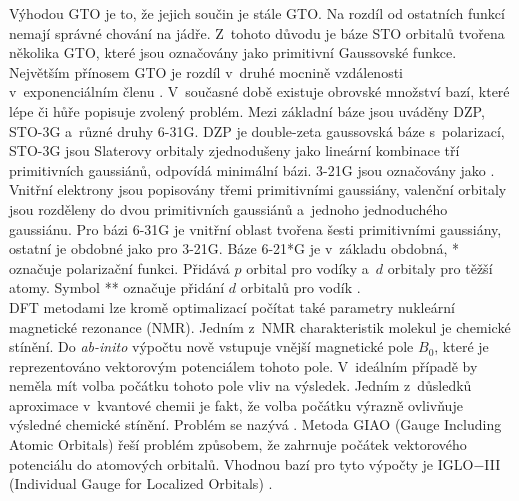 \documentclass[
  printed, %
  table,   %
  lof,     %
  lot,     %
  oneside,
]{fithesis3}
\begin{document}
 Výhodou GTO je to, že jejich součin je stále GTO. Na rozdíl od ostatních funkcí nemají správné chování na jádře. Z~tohoto důvodu je báze STO orbitalů tvořena několika GTO, které jsou označovány jako primitivní Gaussovské funkce. Největším přínosem GTO je rozdíl v~druhé mocnině vzdálenosti v~exponenciálním členu \cite{lowe2011quantum}. 
 V~současné době existuje obrovské množství bazí, které lépe či hůře popisuje zvolený problém. Mezi základní báze jsou uváděny DZP, STO-3G a~různé druhy 6-31G. DZP je double-zeta gaussovská báze s~polarizací, STO-3G jsou Slaterovy orbitaly zjednodušeny jako lineární kombinace tří primitivních gaussiánů, odpovídá minimální bázi. 3-21G jsou označovány jako . Vnitřní elektrony jsou popisovány třemi primitivními gaussiány, valenční orbitaly jsou rozděleny do dvou primitivních gaussiánů a~jednoho jednoduchého gaussiánu. Pro bázi 6-31G je vnitřní oblast tvořena šesti primitivními gaussiány, ostatní je obdobné jako pro 3-21G. Báze 6-21*G je v~základu obdobná, * označuje polarizační funkci. Přidává $p$ orbital pro vodíky a~$d$ orbitaly pro těžší atomy. Symbol ** označuje přidání $d$ orbitalů pro vodík \cite{lowe2011quantum}. \\
 
 DFT metodami lze kromě optimalizací počítat také parametry nukleární magnetické rezonance (NMR). Jedním z~NMR charakteristik molekul je chemické stínění. Do \textit{ab-inito} výpočtu nově vstupuje vnější magnetické pole $B_0$, které je reprezentováno vektorovým potenciálem tohoto pole. V~ideálním případě by neměla mít volba počátku tohoto pole vliv na výsledek. Jedním z~důsledků aproximace v~kvantové chemii je fakt, že volba počátku výrazně ovlivňuje výsledné chemické stínění. Problém se nazývá . Metoda GIAO (Gauge  Including Atomic Orbitals) řeší problém způsobem, že zahrnuje počátek vektorového potenciálu do atomových orbitalů. Vhodnou bazí pro tyto výpočty je IGLO$-$III (Individual Gauge for Localized Orbitals) \cite{Standara2006thesis} \cite{g09}.
\end{document}
